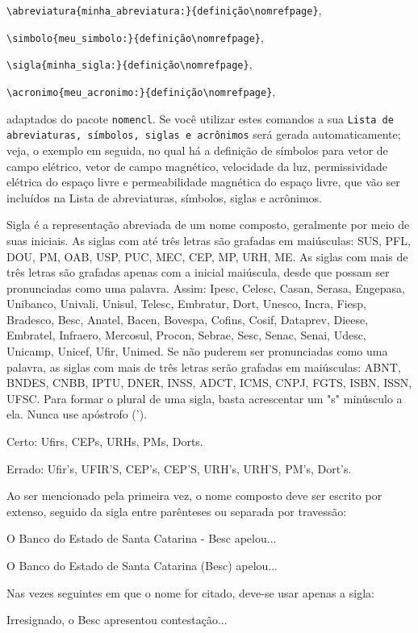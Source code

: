\noindent\verb|\abreviatura{minha_abreviatura:}{definição\nomrefpage}|,

\noindent\verb|\simbolo{meu_simbolo:}{definição\nomrefpage}|,

\noindent\verb|\sigla{minha_sigla:}{definição\nomrefpage}|,

\noindent\verb|\acronimo{meu_acronimo:}{definição\nomrefpage}|,

\noindent adaptados do pacote \texttt{nomencl}. Se você utilizar estes comandos a sua \texttt{Lista de abreviaturas, símbolos, siglas e acrônimos} será gerada automaticamente; veja, o exemplo em seguida, no qual há a definição de símbolos para vetor de campo elétrico, vetor de campo magnético, velocidade da luz, permissividade elétrica do espaço livre e permeabilidade magnética do espaço livre, que vão ser incluídos na Lista de abreviaturas, símbolos, siglas e acrônimos.

Sigla é a representação abreviada de um nome composto, geralmente por meio de suas iniciais. As siglas com até três letras são grafadas em maiúsculas: SUS, PFL, DOU, PM, OAB, USP, PUC, MEC, CEP, MP, URH, ME. As siglas com mais de três letras são grafadas apenas com a inicial maiúscula, desde que possam ser pronunciadas como uma palavra. Assim: Ipesc, Celesc, Casan, Serasa, Engepasa, Unibanco, Univali, Unisul, Telesc, Embratur, Dort, Unesco, Incra, Fiesp, Bradesco, Besc, Anatel, Bacen, Bovespa, Cofins, Cosif, Dataprev, Dieese, Embratel, Infraero, Mercosul, Procon, Sebrae, Sesc, Senac, Senai, Udesc, Unicamp, Unicef, Ufir, Unimed. Se não puderem ser pronunciadas como uma palavra, as siglas com mais de três letras serão grafadas em maiúsculas: ABNT, BNDES, CNBB, IPTU, DNER, INSS, ADCT, ICMS, CNPJ, FGTS, ISBN, ISSN, UFSC. Para formar o plural de uma sigla, basta acrescentar um "s" minúsculo a ela. Nunca use apóstrofo (').

Certo: Ufirs, CEPs, URHs, PMs, Dorts.

Errado: Ufir's, UFIR'S, CEP's, CEP'S, URH's, URH'S, PM's, Dort's. 

Ao ser mencionado pela primeira vez, o nome composto deve ser escrito por extenso, seguido da sigla entre parênteses ou separada por travessão:

O Banco do Estado de Santa Catarina - Besc apelou...

O Banco do Estado de Santa Catarina (Besc) apelou...

Nas vezes seguintes em que o nome for citado, deve-se usar apenas a sigla:

Irresignado, o Besc apresentou contestação... 

